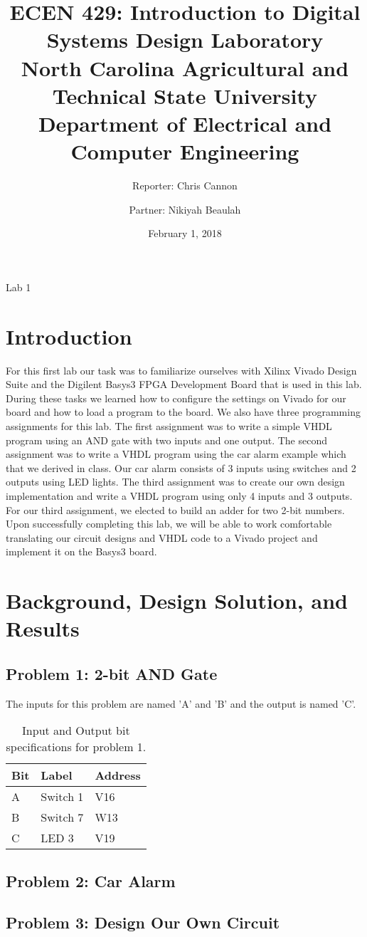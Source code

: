 \documentclass[11pt]{article}
\title {ECEN 429: Introduction to Digital Systems Design Laboratory \\ North Carolina Agricultural and Technical State University \\ Department of Electrical and Computer Engineering} %
\author{Reporter: Chris Cannon \\ \and Partner: Nikiyah Beaulah} %
\date{February 1, 2018}
\begin{document}
\maketitle %

\begin{center}
Lab	1
\end{center}

\pagebreak

\section{Introduction}
For this first lab our task was to familiarize ourselves with Xilinx Vivado Design Suite and the Digilent Basys3 FPGA Development Board that is used in this lab. During these tasks we learned how to configure the settings on Vivado for our board and how to load a program to the board. We also have three programming assignments for this lab. The first assignment was to write a simple VHDL program using an AND gate with two inputs and one output. The second assignment was to write a VHDL program using the car alarm example which that we derived in class. Our car alarm consists of 3 inputs using switches and 2 outputs using LED lights.  The third assignment was to create our own design implementation and write a VHDL program using only 4 inputs and 3 outputs. For our third assignment, we elected to build an adder for two 2-bit numbers. Upon successfully completing this lab, we will be able to work comfortable translating our circuit designs and VHDL code to a Vivado project and implement it on the Basys3 board.

\section{Background, Design Solution, and Results}
\subsection{Problem 1: 2-bit AND Gate}

The inputs for this problem are named 'A' and 'B' and the output is named 'C'.


\begin{table}[h]
\begin{center}
\begin{tabular}{| l | l | l |}
	\hline
	Bit & Label & Address\\ \hline
	A & Switch 1 & V16\\ \hline
	B & Switch 7 & W13\\ \hline
	C & LED 3 & V19\\
	\hline
\end{tabular}
\caption{\label{tab:table-name}Input and Output bit specifications for problem 1.}
\end{center}
\end{table}


\subsection{Problem 2: Car Alarm}
\subsection{Problem 3: Design Our Own Circuit}
\end{document}
